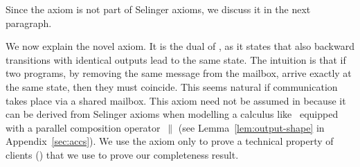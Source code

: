Since the axiom \outputdeterminacyinv is not part of Selinger
axioms, we discuss it in the next paragraph.



We now explain the novel
\outputdeterminacyinv axiom.
It is the dual of \outputdeterminacy, as it states that
also backward transitions with identical outputs lead to the same
state. The intuition is that if two programs, by removing the
same message from the mailbox, arrive exactly at the same
state, then
they must coincide. This seems natural if communication takes place
via a shared mailbox.
This axiom need not be assumed in \cite{DBLP:conf/concur/Selinger97}
because it can be derived from Selinger axioms when modelling a calculus like~\ACCS
equipped with a parallel composition operator~$\parallel$ (see
Lemma~\ref{lem:output-shape} in Appendix~\ref{sec:accs}).
We use the \outputdeterminacyinv axiom only to prove a technical property of clients () that we use to prove our completeness result.


